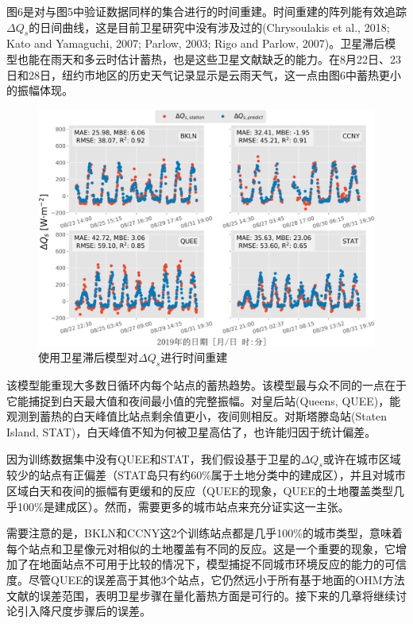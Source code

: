 \documentclass[3p,times]{elsarticle}
\begin{document}
图6是对与图5中验证数据同样的集合进行的时间重建。时间重建的阵列能有效追踪$\Delta Q_s$的日间曲线，这是目前卫星研究中没有涉及过的(Chrysoulakis et al., 2018; Kato and Yamaguchi, 2007; Parlow, 2003; Rigo and Parlow, 2007)。卫星滞后模型也能在雨天和多云时估计蓄热，也是这些卫星文献缺乏的能力。在8月22日、23日和28日，纽约市地区的历史天气记录显示是云雨天气，这一点由图6中蓄热更小的振幅体现。

\begin{figure}[htb]
    \begin{center}
        \includegraphics[width=\linewidth]{img/图6.png}
    \end{center}
    \caption{使用卫星滞后模型对$\Delta Q_s$进行时间重建}
\end{figure}

该模型能重现大多数日循环内每个站点的蓄热趋势。该模型最与众不同的一点在于它能捕捉到白天最大值和夜间最小值的完整振幅。对皇后站(Queens, QUEE)，能观测到蓄热的白天峰值比站点剩余值更小，夜间则相反。对斯塔滕岛站(Staten Island, STAT)，白天峰值不知为何被卫星高估了，也许能归因于统计偏差。

因为训练数据集中没有QUEE和STAT，我们假设基于卫星的$\Delta Q_s$或许在城市区域较少的站点有正偏差（STAT岛只有约60\%属于土地分类中的建成区），并且对城市区域白天和夜间的振幅有更缓和的反应（QUEE的现象，QUEE的土地覆盖类型几乎100\%是建成区）。然而，需要更多的城市站点来充分证实这一主张。

需要注意的是，BKLN和CCNY这2个训练站点都是几乎100\%的城市类型，意味着每个站点和卫星像元对相似的土地覆盖有不同的反应。这是一个重要的现象，它增加了在地面站点不可用于比较的情况下，模型捕捉不同城市环境反应的能力的可信度。尽管QUEE的误差高于其他3个站点，它仍然远小于所有基于地面的OHM方法文献的误差范围，表明卫星步骤在量化蓄热方面是可行的。接下来的几章将继续讨论引入降尺度步骤后的误差。
\end{document}
